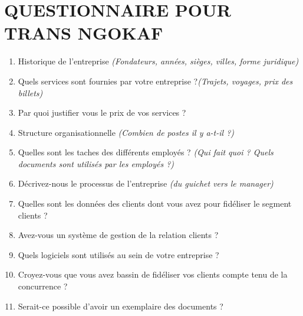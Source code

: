 \documentclass[a4paper,12pt,oneside]{book}
\begin{document}
    \chapter*{QUESTIONNAIRE POUR TRANS NGOKAF}
        \begin{enumerate}
            \item Historique de l’entreprise \textit{(Fondateurs, années, sièges, villes, forme juridique)}
            \item Quels services sont fournies par votre entreprise ?\textit{(Trajets, voyages, prix des billets)}
            \item Par quoi justifier vous le prix de vos services ?
            \item Structure organisationnelle \textit{(Combien de postes il y a-t-il ?)}
            \item Quelles sont les taches des différents employés ? \textit{(Qui fait quoi ? Quels documents
            sont utilisés par les employés ?)}
            \item Décrivez-nous le processus de l’entreprise \textit{(du guichet vers le manager)}
            \item Quelles sont les données des clients dont vous avez pour fidéliser le segment clients ?
            \item Avez-vous un système de gestion de la relation clients ?
            \item Quels logiciels sont utilisés au sein de votre entreprise ?
            \item Croyez-vous que vous avez bassin de fidéliser vos clients compte tenu de la concurrence ? 
            \item Serait-ce possible d’avoir un exemplaire des documents ?
        \end{enumerate}
\end{document}
